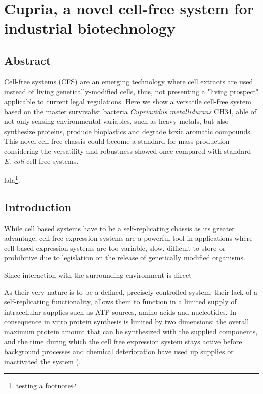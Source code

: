 \chapter{Cupria, a novel cell-free system for industrial biotechnology}

\section{\textbf{Abstract }}

Cell-free systems (CFS) are an emerging technology where cell extracts are used instead of living genetically-modified cells, thus, not presenting a "living prospect" applicable to current legal regulations.  Here we show a versatile cell-free system based on the master survivalist bacteria \textit{Cupriavidus  metallidurans} CH34, able of not only sensing environmental variables, such as heavy metals, but also synthesize proteins, produce bioplastics and degrade toxic aromatic compounds. This novel cell-free  chassis  could  become  a  standard  for  mass production considering the versatility and robustness showed once compared with standard \textit{E. coli} cell-free systems. 

lala\footnote{testing a footnote}.

\section{\textbf{Introduction }}

While cell based systems have to be a self-replicating chassis as its greater advantage, cell-free expression systems are a powerful tool in applications where cell based expression systems are too variable, slow, difficult to store or prohibitive due to legislation on the release of genetically modified organisms. 

Since interaction with the surrounding environment is direct

As their very nature is to be a defined, precisely controlled system, their lack of a self-replicating functionality, allows them to function in a limited supply of intracellular supplies such as ATP sources, amino acids and nucleotides. In consequence in vitro protein synthesis is limited by two dimensions: the overall maximum protein amount that can be synthesized with the supplied components, and the time during which the cell free expression system stays active before background processes and chemical deterioration have used up supplies or inactivated the system (\cite{carlson2012cell,bernhard2013cell,kwon2015high}.
